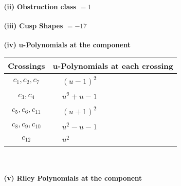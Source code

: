 \documentclass[1p]{elsarticle_modified}
\theoremstyle{definition}
\begin{document}
\flushleft \textbf{(ii) Obstruction class $= 1$}\\~\\
\flushleft \textbf{(iii) Cusp Shapes $= -17$}\\~\\
\newpage\renewcommand{\arraystretch}{1}
\flushleft \textbf{(iv) u-Polynomials at the component}\newline \\
\begin{tabular}{m{50pt}|m{274pt}}
Crossings & \hspace{64pt}u-Polynomials at each crossing \\
\hline $$\begin{aligned}c_{1},c_{2},c_{7}\end{aligned}$$&$\begin{aligned}
&(u-1)^2
\end{aligned}$\\
\hline $$\begin{aligned}c_{3},c_{4}\end{aligned}$$&$\begin{aligned}
&u^2+u-1
\end{aligned}$\\
\hline $$\begin{aligned}c_{5},c_{6},c_{11}\end{aligned}$$&$\begin{aligned}
&(u+1)^2
\end{aligned}$\\
\hline $$\begin{aligned}c_{8},c_{9},c_{10}\end{aligned}$$&$\begin{aligned}
&u^2- u-1
\end{aligned}$\\
\hline $$\begin{aligned}c_{12}\end{aligned}$$&$\begin{aligned}
&u^2
\end{aligned}$\\
\hline
\end{tabular}\\~\\
\newpage\renewcommand{\arraystretch}{1}
\flushleft \textbf{(v) Riley Polynomials at the component}\newline \\
\end{document}
